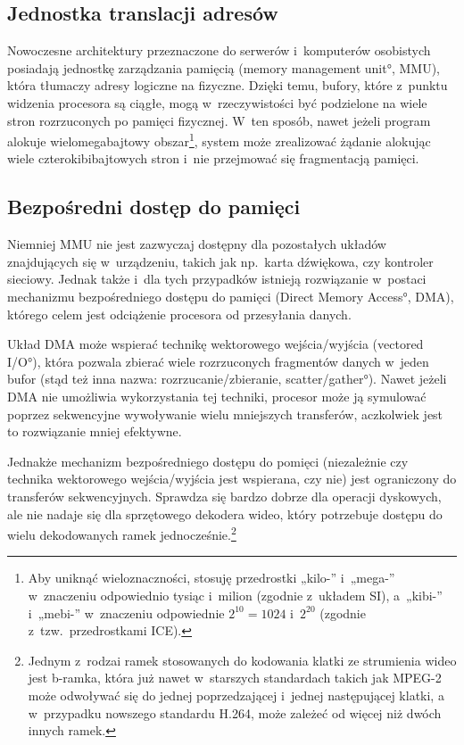\subsection{Jednostka translacji adresów}

Nowoczesne architektury przeznaczone do serwerów i~komputerów
osobistych posiadają jednostkę zarządzania pamięcią (\ang{memory
  management unit}, MMU), która tłumaczy adresy logiczne na fizyczne.
Dzięki temu, bufory, które z~punktu widzenia procesora są ciągłe, mogą
w~rzeczywistości być podzielone na wiele stron rozrzuconych po pamięci
fizycznej.  W~ten sposób, nawet jeżeli program alokuje
wielomegabajtowy obszar\footnote{Aby uniknąć wieloznaczności, stosuję
  przedrostki „kilo-” i~„mega-” w~znaczeniu odpowiednio tysiąc
  i~milion (zgodnie z~układem SI), a~„kibi-” i~„mebi-” w~znaczeniu
  odpowiednie $2^{10} = 1024$ i~$2^{20}$ (zgodnie
  z~tzw.\ przedrostkami ICE).}, system może zrealizować żądanie
alokując wiele czterokibibajtowych stron i~nie przejmować się
fragmentacją pamięci.

\subsection{Bezpośredni dostęp do pamięci}

Niemniej MMU nie jest zazwyczaj dostępny dla pozostałych układów
znajdujących się w~urządzeniu, takich jak np.\ karta dźwiękowa, czy
kontroler sieciowy.  Jednak także i~dla tych przypadków istnieją
rozwiązanie w~postaci mechanizmu bezpośredniego dostępu do pamięci
(\ang{Direct Memory Access}, DMA), którego celem jest odciążenie
procesora od przesyłania danych.

Układ DMA może wspierać technikę wektorowego wejścia/wyjścia
(\ang{vectored I/O}), która pozwala zbierać wiele rozrzuconych
fragmentów danych w~jeden bufor (stąd też inna nazwa:
rozrzucanie/zbieranie, \ang{scatter/gather}).  Nawet jeżeli DMA nie
umożliwia wykorzystania tej techniki, procesor może ją symulować
poprzez sekwencyjne wywoływanie wielu mniejszych transferów,
aczkolwiek jest to rozwiązanie mniej efektywne.

Jednakże mechanizm bezpośredniego dostępu do pomięci (niezależnie czy
technika wektorowego wejścia/wyjścia jest wspierana, czy nie) jest
ograniczony do transferów sekwencyjnych.  Sprawdza się bardzo dobrze
dla operacji dyskowych, ale nie nadaje się dla sprzętowego dekodera
wideo, który potrzebuje dostępu do wielu dekodowanych ramek
jednocześnie.\footnote{Jednym z~rodzai ramek stosowanych do kodowania
  klatki ze strumienia wideo jest b-ramka, która już nawet w~starszych
  standardach takich jak MPEG-2 może odwoływać się do jednej
  poprzedzającej i~jednej następującej klatki, a w~przypadku nowszego
  standardu H.264, może zależeć od więcej niż dwóch innych ramek.}

